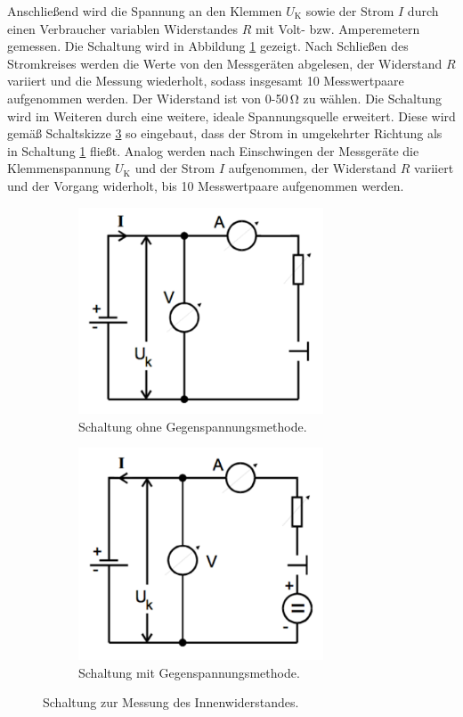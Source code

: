 Anschließend wird die Spannung an den Klemmen $U_\text{K}$ sowie der Strom $I$ durch einen Verbraucher variablen Widerstandes $R$ mit Volt- bzw. Amperemetern gemessen.
Die Schaltung wird in Abbildung \ref{fig:ri} gezeigt.
Nach Schließen des Stromkreises werden die Werte von den Messgeräten abgelesen, der Widerstand $R$ variiert und die Messung wiederholt, sodass insgesamt 10 Messwertpaare aufgenommen werden.
Der Widerstand ist von 0-50\,\si{\ohm} zu wählen.
Die Schaltung wird im Weiteren durch eine weitere, ideale Spannungsquelle erweitert.
Diese wird gemäß Schaltskizze \ref{fig:rimgu} so eingebaut, dass der Strom in umgekehrter Richtung als in Schaltung \ref{fig:ri} fließt.
Analog werden nach Einschwingen der Messgeräte die Klemmenspannung $U_\text{K}$ und der Strom $I$ aufgenommen, der Widerstand $R$ variiert und der Vorgang widerholt, bis 10 Messwertpaare aufgenommen werden.
\begin{figure}
	\begin{subfigure}{0.5\textwidth}
	\centering
	\includegraphics[width=0.8\textwidth]{Bilder/Messung1.pdf}
	\caption{Schaltung ohne Gegenspannungsmethode.}
	\label{fig:ri}
	\end{subfigure}
	\begin{subfigure}{0.5\textwidth}
	\centering
	\includegraphics[width=0.8\textwidth]{Bilder/Messung2.pdf}
	\caption{Schaltung mit Gegenspannungsmethode.}
	\label{fig:rimgu}
	\end{subfigure}
	\caption{Schaltung zur Messung des Innenwiderstandes.}
\end{figure}

